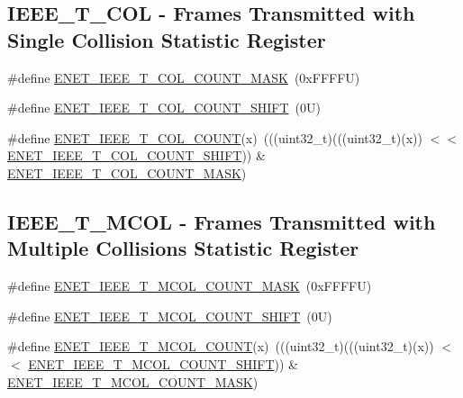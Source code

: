 \subsection*{I\+E\+E\+E\+\_\+\+T\+\_\+C\+OL -\/ Frames Transmitted with Single Collision Statistic Register}
\begin{DoxyCompactItemize}
\item 
\#define \mbox{\hyperlink{group___e_n_e_t___register___masks_ga7306aeb15187e2182972050a1dad04f1}{E\+N\+E\+T\+\_\+\+I\+E\+E\+E\+\_\+\+T\+\_\+C\+O\+L\+\_\+\+C\+O\+U\+N\+T\+\_\+\+M\+A\+SK}}~(0x\+F\+F\+F\+F\+U)
\item 
\#define \mbox{\hyperlink{group___e_n_e_t___register___masks_ga5d76cc219ed04226ca7b8049d9acf2d6}{E\+N\+E\+T\+\_\+\+I\+E\+E\+E\+\_\+\+T\+\_\+C\+O\+L\+\_\+\+C\+O\+U\+N\+T\+\_\+\+S\+H\+I\+FT}}~(0\+U)
\item 
\#define \mbox{\hyperlink{group___e_n_e_t___register___masks_gae4425db78c38e5e711a6fbcf76808d9d}{E\+N\+E\+T\+\_\+\+I\+E\+E\+E\+\_\+\+T\+\_\+C\+O\+L\+\_\+\+C\+O\+U\+NT}}(x)~(((uint32\+\_\+t)(((uint32\+\_\+t)(x)) $<$$<$ \mbox{\hyperlink{group___e_n_e_t___register___masks_ga5d76cc219ed04226ca7b8049d9acf2d6}{E\+N\+E\+T\+\_\+\+I\+E\+E\+E\+\_\+\+T\+\_\+C\+O\+L\+\_\+\+C\+O\+U\+N\+T\+\_\+\+S\+H\+I\+FT}})) \& \mbox{\hyperlink{group___e_n_e_t___register___masks_ga7306aeb15187e2182972050a1dad04f1}{E\+N\+E\+T\+\_\+\+I\+E\+E\+E\+\_\+\+T\+\_\+C\+O\+L\+\_\+\+C\+O\+U\+N\+T\+\_\+\+M\+A\+SK}})
\end{DoxyCompactItemize}
\subsection*{I\+E\+E\+E\+\_\+\+T\+\_\+\+M\+C\+OL -\/ Frames Transmitted with Multiple Collisions Statistic Register}
\begin{DoxyCompactItemize}
\item 
\#define \mbox{\hyperlink{group___e_n_e_t___register___masks_ga8c5aa3e3b3754724a33b871ec266dfae}{E\+N\+E\+T\+\_\+\+I\+E\+E\+E\+\_\+\+T\+\_\+\+M\+C\+O\+L\+\_\+\+C\+O\+U\+N\+T\+\_\+\+M\+A\+SK}}~(0x\+F\+F\+F\+F\+U)
\item 
\#define \mbox{\hyperlink{group___e_n_e_t___register___masks_gafc71cbe43a3a04af9ab56efe38f08b82}{E\+N\+E\+T\+\_\+\+I\+E\+E\+E\+\_\+\+T\+\_\+\+M\+C\+O\+L\+\_\+\+C\+O\+U\+N\+T\+\_\+\+S\+H\+I\+FT}}~(0\+U)
\item 
\#define \mbox{\hyperlink{group___e_n_e_t___register___masks_ga4cc2d69b86d1de93eb581bb43d37b243}{E\+N\+E\+T\+\_\+\+I\+E\+E\+E\+\_\+\+T\+\_\+\+M\+C\+O\+L\+\_\+\+C\+O\+U\+NT}}(x)~(((uint32\+\_\+t)(((uint32\+\_\+t)(x)) $<$$<$ \mbox{\hyperlink{group___e_n_e_t___register___masks_gafc71cbe43a3a04af9ab56efe38f08b82}{E\+N\+E\+T\+\_\+\+I\+E\+E\+E\+\_\+\+T\+\_\+\+M\+C\+O\+L\+\_\+\+C\+O\+U\+N\+T\+\_\+\+S\+H\+I\+FT}})) \& \mbox{\hyperlink{group___e_n_e_t___register___masks_ga8c5aa3e3b3754724a33b871ec266dfae}{E\+N\+E\+T\+\_\+\+I\+E\+E\+E\+\_\+\+T\+\_\+\+M\+C\+O\+L\+\_\+\+C\+O\+U\+N\+T\+\_\+\+M\+A\+SK}})
\end{DoxyCompactItemize}
